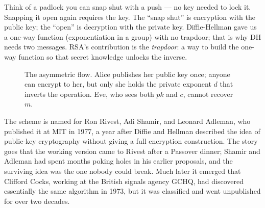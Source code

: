 \begin{intuitionbox}
Think of a padlock you can snap shut with a push --- no key needed to lock it. Snapping it open again requires the key. The ``snap shut'' is encryption with the public key; the ``open'' is decryption with the private key. Diffie-Hellman gave us a one-way function (exponentiation in a group) with no trapdoor; that is why DH needs two messages. RSA's contribution is the \emph{trapdoor}: a way to build the one-way function so that secret knowledge unlocks the inverse.
\end{intuitionbox}

\begin{figure}[H]
\centering
{}
\caption{The asymmetric flow. Alice publishes her public key once; anyone can encrypt to her, but only she holds the private exponent $d$ that inverts the operation. Eve, who sees both $pk$ and $c$, cannot recover $m$.}
\label{ch19:flow-diagram}
\end{figure}

\begin{historybox}
The scheme is named for Ron Rivest, Adi Shamir, and Leonard Adleman, who published it at MIT in 1977, a year after Diffie and Hellman described the idea of public-key cryptography without giving a full encryption construction. The story goes that the working version came to Rivest after a Passover dinner; Shamir and Adleman had spent months poking holes in his earlier proposals, and the surviving idea was the one nobody could break. Much later it emerged that Clifford Cocks, working at the British signals agency GCHQ, had discovered essentially the same algorithm in 1973, but it was classified and went unpublished for over two decades.
\end{historybox}


